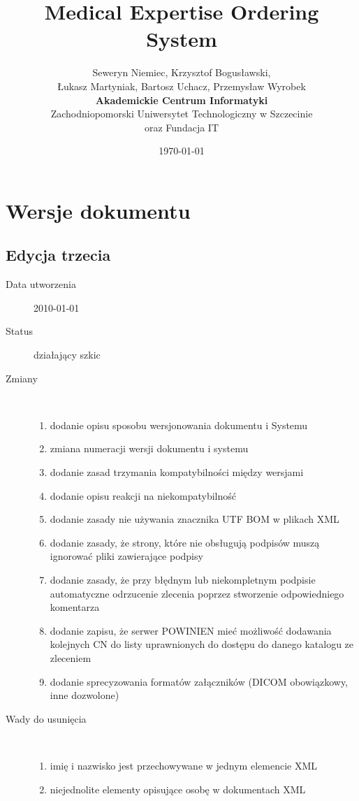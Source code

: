 \documentclass[a4paper]{article}
\begin{document}
\title{Medical Expertise Ordering System}
\author{Seweryn Niemiec, Krzysztof Bogusławski,\\ 
Łukasz Martyniak, Bartosz Uchacz, Przemysław Wyrobek \\ 
\textbf{Akademickie Centrum Informatyki} \\ 
Zachodniopomorski Uniwersytet Technologiczny w Szczecinie\\
oraz Fundacja IT}
\date{\today}
\maketitle
\tableofcontents
\listoffigures
\listoftables

\section{Wersje dokumentu}
\subsection{Edycja trzecia}
\begin{description}
  \item[Data utworzenia] 2010-01-01
  \item[Status] działający szkic
  \item[Zmiany] \hfill \\
	\begin{enumerate}
      \item dodanie opisu sposobu wersjonowania dokumentu i Systemu
      \item zmiana numeracji wersji dokumentu i systemu
      \item dodanie zasad trzymania kompatybilności między wersjami
	  \item dodanie opisu reakcji na niekompatybilność
      \item dodanie zasady nie używania znacznika UTF BOM w plikach XML
      \item dodanie zasady, że strony, które nie obsługują podpisów muszą ignorować
      pliki zawierające podpisy
      \item dodanie zasady, że przy błędnym lub niekompletnym podpisie automatyczne
      odrzucenie zlecenia poprzez stworzenie odpowiedniego komentarza
      \item dodanie zapisu, że serwer POWINIEN mieć możliwość dodawania kolejnych CN do
      listy uprawnionych do dostępu do danego katalogu ze zleceniem
      \item dodanie sprecyzowania formatów załączników (DICOM obowiązkowy, inne dozwolone)
	\end{enumerate}
  \item[Wady do usunięcia] \hfill \\
	\begin{enumerate}
      \item imię i nazwisko jest przechowywane w jednym elemencie XML
      \item niejednolite elementy opisujące osobę w dokumentach XML
	\end{enumerate}
\end{description}
\end{document}
